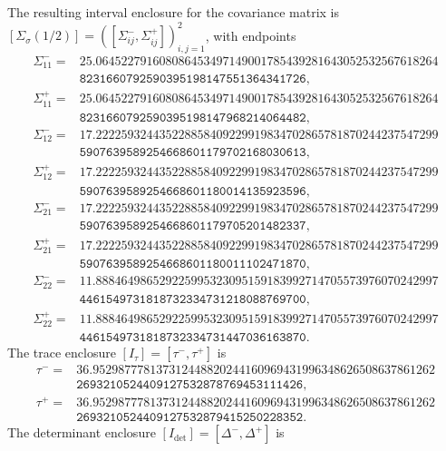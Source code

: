 \endgroup

The resulting interval enclosure for the covariance matrix is
\([\Sigma_\sigma(1/2)]=([\Sigma_{ij}^-,\Sigma_{ij}^+])_{i,j=1}^2\), with
endpoints
{\footnotesize
\[
\begin{aligned}
\Sigma_{11}^-={}&
\mathtt{25.064522791608086453497149001785439281643052532567618264}\\
&\mathtt{8231660792590395198147551364341726},\\
\Sigma_{11}^+={}&
\mathtt{25.064522791608086453497149001785439281643052532567618264}\\
&\mathtt{8231660792590395198147968214064482},\\
\Sigma_{12}^-={}&
\mathtt{17.222259324435228858409229919834702865781870244237547299}\\
&\mathtt{5907639589254668601179702168030613},\\
\Sigma_{12}^+={}&
\mathtt{17.222259324435228858409229919834702865781870244237547299}\\
&\mathtt{5907639589254668601180014135923596},\\
\Sigma_{21}^-={}&
\mathtt{17.222259324435228858409229919834702865781870244237547299}\\
&\mathtt{5907639589254668601179705201482337},\\
\Sigma_{21}^+={}&
\mathtt{17.222259324435228858409229919834702865781870244237547299}\\
&\mathtt{5907639589254668601180011102471870},\\
\Sigma_{22}^-={}&
\mathtt{11.888464986529225995323095159183992714705573976070242997}\\
&\mathtt{4461549731818732334731218088769700},\\
\Sigma_{22}^+={}&
\mathtt{11.888464986529225995323095159183992714705573976070242997}\\
&\mathtt{4461549731818732334731447036163870}.
\end{aligned}
\]
}
The trace enclosure \([I_\tau]=[\tau^-,\tau^+]\) is
{\footnotesize
\[
\begin{aligned}
\tau^-={}&
\mathtt{36.952987778137312448820244160969431996348626508637861262}\\
&\mathtt{2693210524409127532878769453111426},\\
\tau^+={}&
\mathtt{36.952987778137312448820244160969431996348626508637861262}\\
&\mathtt{2693210524409127532879415250228352}.
\end{aligned}
\]
}
The determinant enclosure \([I_{\det}]=[\Delta^-,\Delta^+]\) is
